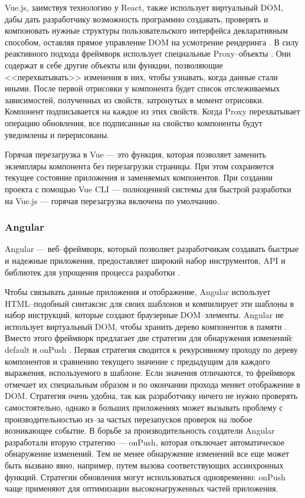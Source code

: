 Vue.js, заимствуя технологию у React, также использует виртуальный DOM, дабы дать разработчику возможность программно создавать, проверять и компоновать нужные структуры пользовательского интерфейса декларативным способом, оставляя прямое управление DOM на усмотрение рендеринга \cite{vue-render}.
В силу реактивного подхода фреймворк использует специальные Proxy--объекты \cite{vue-proxy}. Они содержат в себе другие объекты или функции, позволяющие <<перехватывать>> изменения в них, чтобы узнавать, когда данные стали иными.
После первой отрисовки у компонента будет список отслеживаемых зависимостей, полученных из свойств, затронутых в момент отрисовки. 
Компонент подписывается на каждое из этих свойств.
Когда Proxy перехватывает операцию обновления, все подписанные на свойство компоненты будут уведомлены и перерисованы.

Горячая перезагрузка в Vue --- это функция, которая позволяет заменить экземпляры компонента без перезагрузки страницы. 
При этом сохраняется текущее состояние приложения и заменяемых компонентов.
При создании проекта с помощью Vue CLI --- полноценной системы для быстрой разработки на Vue.js \cite{vue-cli} --- горячая перезагрузка включена по умолчанию. 


\subsubsection{Angular}

Angular --- веб--фреймворк, который позволяет разработчикам создавать быстрые и надежные приложения, предоставляет широкий набор инструментов, API и библиотек для упрощения процесса разработки \cite{angular}. 

Чтобы связывать данные приложения и отображение,  Angular использует HTML--подобный синтаксис для своих шаблонов и компилирует эти шаблоны в набор инструкций, которые создают браузерные DOM--элементы. 
Angular не использует виртуальный DOM, чтобы хранить дерево компонентов в памяти \cite{angular-dom}.
Вместо этого фреймворк предлагает две стратегии для обнаружения изменений: default и onPush \cite{angular-strategy}.
Первая стратегия сводится к рекурсивному проходу по дереву компонентов и сравнению текущего значение с предыдущим для каждого выражения, используемого в шаблоне. 
Если значения отличаются, то фреймворк отмечает их специальным образом и по окончании прохода меняет отображение в DOM.
Стратегия очень удобна, так как разработчику ничего не нужно проверять самостоятельно, однако в больших приложениях может вызывать проблему с производительностью из--за частых перезапусков проверок на любое возникающее событие. 
В борьбе за производительность создатели Angular разработали вторую стратегию --- onPush, которая отключает автоматическое обнаружение изменений.
Тем не менее обнаружение изменений все еще может быть вызвано явно, например, путем вызова соответствующих ассинхронных функций.
Стратегии обновления могут использоваться одновременно: onPush чаще применяют для оптимизации высоконагруженных частей приложения.

